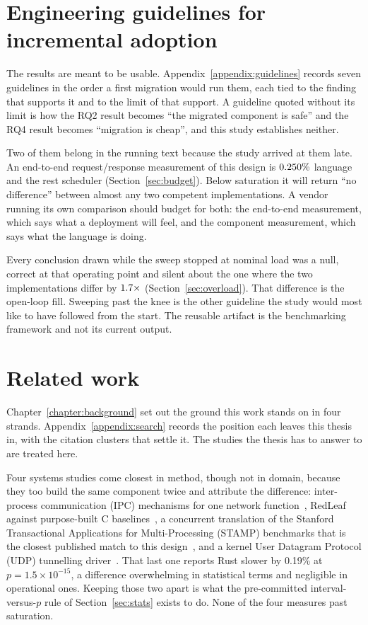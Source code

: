 \documentclass[english,oneside,a4paper,censored,csm,software-track-2020]{HYthesisML}
\begin{document}
\section{Engineering guidelines for incremental adoption}
\label{sec:guidelines}
The results are meant to be usable. Appendix~\ref{appendix:guidelines} records seven guidelines
in the order a first migration would run them, each tied to the finding that supports it and to
the limit of that support. A guideline quoted without its limit is how the RQ2 result becomes
``the migrated component is safe'' and the RQ4 result becomes ``migration is cheap'', and this
study establishes neither.

Two of them belong in the running text because the study arrived at them late. An end-to-end
request/response measurement of this design is $0.250\%$ language and the rest
scheduler (Section~\ref{sec:budget}). Below saturation it will return ``no difference'' between
almost any two competent implementations. A vendor running its own comparison should budget for
both: the end-to-end measurement, which says what a deployment will feel, and the component
measurement, which says what the language is doing.

Every conclusion drawn while the sweep stopped at nominal load was a null, correct at that
operating point and silent about the one where the two implementations differ by
$1.7\times$ (Section~\ref{sec:overload}). That difference is the open-loop fill. Sweeping past the knee is the other
guideline the study would most like to have followed from the start. The reusable artifact is
the benchmarking framework and not its current output.

\section{Related work}\label{sec:relatedwork}
Chapter~\ref{chapter:background} set out the ground this work stands on in four strands.
Appendix~\ref{appendix:search} records the position each leaves this thesis in, with the
citation clusters that settle it. The studies the thesis has to answer to are treated here.

Four systems studies come closest in method, though not in domain, because they too build the
same component twice and attribute the difference: inter-process communication (IPC) mechanisms
for one network function~\cite{li2021ipc}, RedLeaf against purpose-built C
baselines~\cite{narayanan2020redleaf}, a concurrent translation of the Stanford Transactional
Applications for Multi-Processing (STAMP) benchmarks that is the closest published match to this
design~\cite{suchert2023stamp}, and a kernel User Datagram Protocol (UDP) tunnelling
driver~\cite{gonzalez2023rustudp}. That last one reports Rust slower
by 0.19\% at $p = 1.5 \times 10^{-15}$, a difference overwhelming in statistical terms and negligible
in operational ones. Keeping those two apart is what the pre-committed interval-versus-$p$
rule of Section~\ref{sec:stats} exists to do. None of the four measures past saturation.
\end{document}
